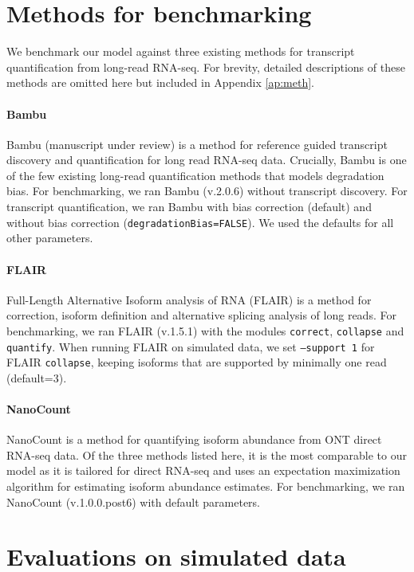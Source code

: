 \section{Methods for benchmarking}

We benchmark our model against three existing methods for transcript quantification from long-read RNA-seq. For brevity, detailed descriptions of these methods are omitted here but included in Appendix \ref{ap:meth}.

\paragraph{Bambu} Bambu (manuscript under review) \cite{Bambu2022} is a method for reference guided transcript discovery and quantification for long read RNA-seq data. Crucially, Bambu is one of the few existing long-read quantification methods that models degradation bias. For benchmarking, we ran Bambu (v.2.0.6) without transcript discovery. For transcript quantification, we ran Bambu with bias correction (default) and without bias correction (\texttt{degradationBias=FALSE}). We used the defaults for all other parameters.

\paragraph{FLAIR} Full-Length Alternative Isoform analysis of RNA (FLAIR) \cite{Tang2020} is a method for correction, isoform definition and alternative splicing analysis of long reads. For benchmarking, we ran FLAIR (v.1.5.1) with the modules \texttt{correct}, \texttt{collapse} and \texttt{quantify}. When running FLAIR on simulated data, we set \texttt{--support 1} for FLAIR \texttt{collapse}, keeping isoforms that are supported by minimally one read (default=3).  

\paragraph{NanoCount} NanoCount \cite{Gleeson2021} is a method for quantifying isoform abundance from ONT direct RNA-seq data. Of the three methods listed here, it is the most comparable to our model as it is tailored for direct RNA-seq and uses an expectation maximization algorithm for estimating isoform abundance estimates. For benchmarking, we ran NanoCount (v.1.0.0.post6) with default parameters.

\section{Evaluations on simulated data}\label{sec:eval-sim}

